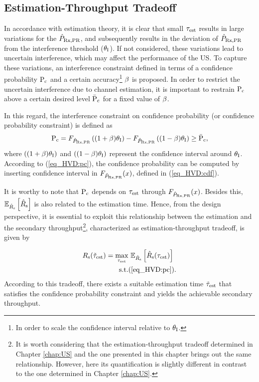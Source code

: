 \subsection{Estimation-Throughput Tradeoff}
In accordance with estimation theory, it is clear that small $\tau_{\text{est}}$ results in large variations for the $\hat{P}_{\text{Rx,PR}}$, and subsequently results in the deviation of $\hat{P}_{\text{Rx,PR}}$ from the interference threshold ($\theta_{\text{I}}$). If not considered, these variations lead to uncertain interference, which may affect the performance of the US. To capture these variations, an interference constraint defined in terms of a confidence probability $\text{P}_{\text{c}}$ and a certain accuracy\footnote{In order to scale the confidence interval relative to $\theta_{\text{I}}$.} $\beta$ is proposed. In order to restrict the uncertain interference due to channel estimation, it is important to restrain $\text{P}_{\text{c}}$ above a certain desired level $\bar{\text{P}}_{\text{c}}$ for a fixed value of $\beta$. 

In this regard, the interference constraint on confidence probability (or confidence probability constraint) is defined as
\begin{align}
\text{P}_{\text{c}} = F_{\hat{P}_{\text{Rx,PR}}} \left( {(1 + \beta) \theta_{\text{I}}}\right)  - F_{\hat{P}_{\text{Rx,PR}}} \left({(1 - \beta) \theta_{\text{I}}} \right) \ge \bar{\text{P}}_{\text{c}}, \label{eq_HVD:pc} 
\end{align}
where $\left( {(1 + \beta) \theta_{\text{I}}}\right)$ and $\left({(1 - \beta) \theta_{\text{I}}} \right)$ represent the confidence interval around $\theta_{\text{I}}$. According to (\ref{eq_HVD:pc}), the confidence probability can be computed by inserting confidence interval in $F_{\hat{P}_{\text{Rx,PR}}}(x)$, defined in (\ref{eq_HVD:cdf}). 

It is worthy to note that $\text{P}_{\text{c}}$ depends on $\tau_{\text{est}}$ through $F_{\hat{P}_{\text{Rx,PR}}}(x)$. Besides this, ${\mathbb E}_{\hat{{{R}}}_{\text{s}}}\left[ \hat{{{R}}}_{\text{s}} \right]$ is also related to the estimation time. Hence, from the design perspective, it is essential to exploit this relationship between the estimation and the secondary throughput\footnote{It is worth considering that the estimation-throughput tradeoff determined in Chapter \ref{chap:US} and the one presented in this chapter brings out the same relationship. However, here its quantification is slightly different in contrast to the one determined in Chapter \ref{chap:US}.}, characterized as estimation-throughput tradeoff, is given by 


\begin{align}
R_{\text{s}}(\tilde{\tau}_{\text{est}}) = \operatorname*{max}_{\tau_{\text{est}}}  & \text{      } {\mathbb E}_{\hat{{{R}}}_{\text{s}}}\left[ \hat{{{R}}}_{\text{s}}(\tau_{\text{est}}) \right] 
 \label{eq_HVD:sys} \\
\text{s.t.} & (\ref{eq_HVD:pc}). \nonumber  
\end{align}
According to this tradeoff, there exists a suitable estimation time $\tilde{\tau}_{\text{est}}$ that satisfies the confidence probability constraint and yields the achievable secondary throughput. 

